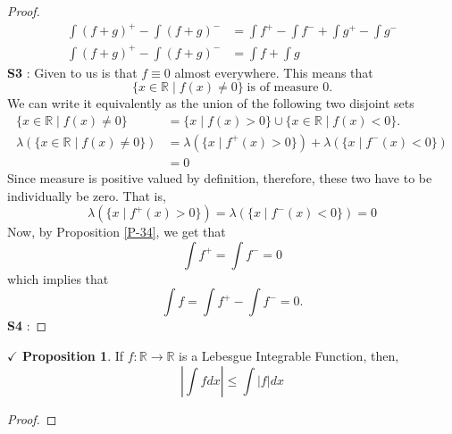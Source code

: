 \documentclass{article}
\theoremstyle{definition}
\theoremstyle{remark}
\theoremstyle{definition}
\theoremstyle{definition}
\newtheorem{proposition}{$\checkmark$ Proposition}
\theoremstyle{definition}
\newcommand{\abs}[1]{\left \vert #1\right \vert}
\newcommand{\union}{\cup}
\newcommand{\where}{\;\vert\;}
\newcommand{\R}{\mathbb{R}}
\newcommand{\lm}[1]{\lambda\left (#1\right )}
\begin{document}
\begin{proof}
\begin{align*}
\int	(f+g)^{+} -\int (f+g)^{-} &=  \int f^{+}  - \int f^{-}+ \int g^{+} - \int g^{-}\\
\int	(f+g)^{+} -\int (f+g)^{-} &=  \int f + \int g
\end{align*}
\textbf{S3} : Given to us is that $ f \equiv  0 $ almost everywhere. This means that 
\[\{x\in \R \where f(x) \neq 0\} \;\text{is of measure }0.\]
We can write it equivalently as the union of the following two disjoint sets
\begin{align*}
	\{x\in \R \where f(x) \neq 0\} &= \{x\where f(x) > 0\} \union \{x\in \R \where f(x) < 0\}.\\
	\lm{	\{x\in \R \where f(x) \neq 0\}}&=  \lm{\{x\where f^{+}(x) > 0\}} + \lm{\{x\where f^{-}(x) < 0\}}\\
	&= 0
\end{align*}
Since measure is positive valued by definition, therefore, these two have to be individually be zero. That is,
\[\lm{\{x\where f^{+}(x) > 0\}} = \lm{\{x\where f^{-}(x) < 0\}} = 0\]
Now, by Proposition \ref{P-34}, we get that
\[\int f^{+} = \int f^{-} = 0\]
which implies that
\[\int f = \int f^{+} - \int f^{-} = 0.\]
\textbf{S4} : 
\end{proof}
\hrulefill
\begin{proposition}
	If $ f : \R \to \R $ is a Lebesgue Integrable Function, then,
	\[\abs{\int fdx} \le \int \abs{f} dx\]
\end{proposition}
\begin{proof}
	
\end{proof}
\hrulefill
\newpage
\end{document}
